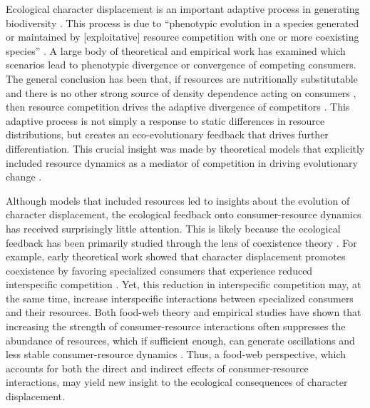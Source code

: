 \documentclass[11pt,]{article}
\begin{document}
Ecological character displacement is an important adaptive process in
generating biodiversity \citep{Schluter2000, Pfennig2010}. This process
is due to ``phenotypic evolution in a species generated or maintained by
{[}exploitative{]} resource competition with one or more coexisting
species'' \citep{Schluter2000}. A large body of theoretical
\citep[e.g.][]{Lawlor1976, Abrams1986, Doebeli1996, Taper1985, McPeek2019}
and empirical \citep[reviewed
in:][]{Schluter2000, Dayan2005, Stuart2013} work has examined which
scenarios lead to phenotypic divergence or convergence of competing
consumers. The general conclusion has been that, if resources are
nutritionally substitutable \citep{Abrams1987, Fox2008} and there is no
other strong source of density dependence acting on consumers
\citep{Abrams1986}, then resource competition drives the adaptive
divergence of competitors \citep{Lawlor1976, Taper1985}. This adaptive
process is not simply a response to static differences in resource
distributions, but creates an eco-evolutionary feedback that drives
further differentiation. This crucial insight was made by theoretical
models that explicitly included resource dynamics as a mediator of
competition in driving evolutionary change
\citep{Lawlor1976, Abrams1986, Taper1985}.

Although models that included resources led to insights about the
evolution of character displacement, the ecological feedback onto
consumer-resource dynamics has received surprisingly little attention.
This is likely because the ecological feedback has been primarily
studied through the lens of coexistence theory
\citep{Lawlor1976, Germain2018, Bassar2017, McPeek2019}. For example,
early theoretical work showed that character displacement promotes
coexistence by favoring specialized consumers that experience reduced
interspecific competition \citep{Lawlor1976}. Yet, this reduction in
interspecific competition may, at the same time, increase interspecific
interactions between specialized consumers and their resources. Both
food-web theory and empirical studies have shown that increasing the
strength of consumer-resource interactions often suppresses the
abundance of resources, which if sufficient enough, can generate
oscillations and less stable consumer-resource dynamics
\citep{Rosenzweig1971, Luckinbill1973, Murdoch2002, Murdoch2003, McCann2011}.
Thus, a food-web perspective, which accounts for both the direct and
indirect effects of consumer-resource interactions, may yield new
insight to the ecological consequences of character displacement.
\end{document}
